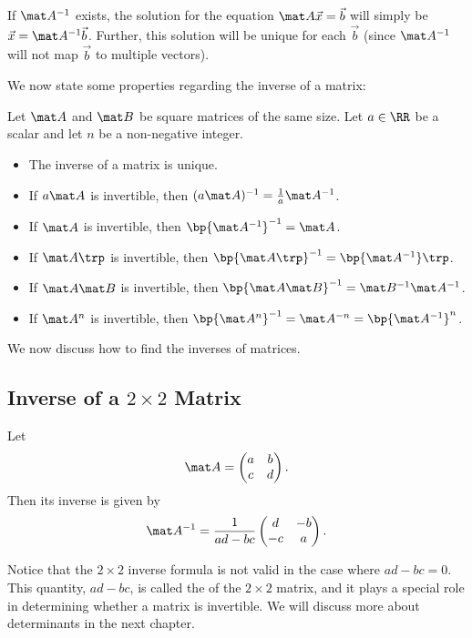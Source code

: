 If $\mat A^{-1}$ exists, the solution for the equation $\mat A \vec x = \vec b$ will simply be $\vec x = \mat A^{-1} \vec b$. Further, this solution will be unique for each $\vec b$ (since $\mat A^{-1}$ will not map $\vec b$ to multiple vectors).


We now state some properties regarding the inverse of a matrix:

\begin{fact}
    Let $\mat A$ and $\mat B$ be square matrices of the same size. Let $a \in \RR$ be a scalar and let $n$ be a non-negative integer.
    \begin{itemize}
        \item The inverse of a matrix is unique.
        \item If $a\mat A$ is invertible, then $(a\mat A)^{-1} = \frac1a \mat A^{-1}$.
        \item If $\mat A$ is invertible, then $\bp{\mat A^{-1}}^{-1} = \mat A$.
        \item If $\mat A \trp$ is invertible, then $\bp{\mat A \trp}^{-1} = \bp{\mat A^{-1}}\trp$.
        \item If $\mat A \mat B$ is invertible, then $\bp{\mat A \mat B}^{-1} = \mat B^{-1} \mat A^{-1}$.
        \item If $\mat A^n$ is invertible, then $\bp{\mat A^n}^{-1} = \mat A^{-n} = \bp{\mat A^{-1}}^n$.
    \end{itemize}
\end{fact}

We now discuss how to find the inverses of matrices.

\subsection{Inverse of a \texorpdfstring{$2 \times 2$}{2 x 2} Matrix}

\begin{proposition}
    Let \[\mat A = \begin{pmatrix}a & b \\ c & d\end{pmatrix}.\] Then its inverse is given by \[\mat A^{-1} = \frac1{ad - bc} \begin{pmatrix}d & - b \\ -c & a\end{pmatrix}.\]
\end{proposition}

Notice that the $2 \times 2$ inverse formula is not valid in the case where $ad - bc = 0$. This quantity, $ad - bc$, is called the  of the $2 \times 2$ matrix, and it plays a special role in determining whether a matrix is invertible. We will discuss more about determinants in the next chapter.

